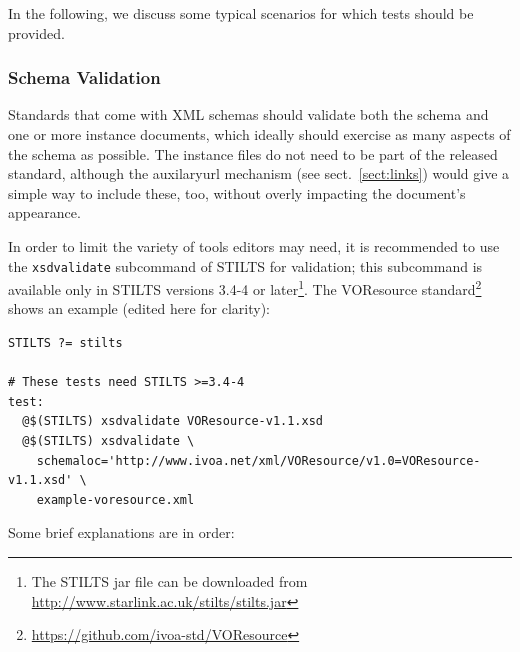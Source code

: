 \documentclass[11pt,a4paper]{ivoa}
\begin{document}
In the following, we discuss some typical scenarios for which tests
should be provided.

\subsubsection{Schema Validation}

Standards that come with XML schemas should validate both the schema and
one or more instance documents, which ideally should exercise as many
aspects of the schema as possible.  The instance files do not need to be
part of the released standard, although the auxilaryurl mechanism (see
sect.~\ref{sect:links}) would give a simple way to include these, too,
without overly impacting the document's appearance.

In order to limit the variety of tools editors may need, it is
recommended to use the \verb|xsdvalidate| subcommand of STILTS
\citep{2006ASPC..351..666T} for validation; this subcommand is available
only in STILTS versions 3.4-4 or later\footnote{The STILTS jar file can be
downloaded from \url{http://www.starlink.ac.uk/stilts/stilts.jar}}.
The VOResource
standard\footnote{\url{https://github.com/ivoa-std/VOResource}} shows an
example (edited here for clarity):

\begin{lstlisting}[basicstyle=\footnotesize]
STILTS ?= stilts

# These tests need STILTS >=3.4-4
test:
  @$(STILTS) xsdvalidate VOResource-v1.1.xsd
  @$(STILTS) xsdvalidate \
    schemaloc='http://www.ivoa.net/xml/VOResource/v1.0=VOResource-v1.1.xsd' \
    example-voresource.xml
\end{lstlisting}

Some brief explanations are in order:
\end{document}
